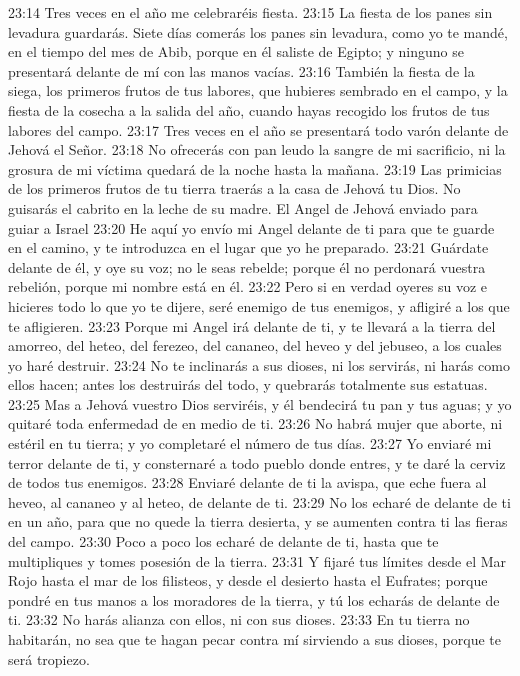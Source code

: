 23:14 Tres veces en el año me celebraréis fiesta. 
23:15 La fiesta de los panes sin levadura guardarás. Siete días comerás los panes sin levadura, como yo te mandé, en el tiempo del mes de Abib, porque en él saliste de Egipto; y ninguno se presentará delante de mí con las manos vacías. 
23:16 También la fiesta de la siega, los primeros frutos de tus labores, que hubieres sembrado en el campo, y la fiesta de la cosecha a la salida del año, cuando hayas recogido los frutos de tus labores del campo. 
23:17 Tres veces en el año se presentará todo varón delante de Jehová el Señor. 
23:18 No ofrecerás con pan leudo la sangre de mi sacrificio, ni la grosura de mi víctima quedará de la noche hasta la mañana. 
23:19 Las primicias de los primeros frutos de tu tierra traerás a la casa de Jehová tu Dios. No guisarás el cabrito en la leche de su madre. 
El Angel de Jehová enviado para guiar a Israel 
23:20 He aquí yo envío mi Angel delante de ti para que te guarde en el camino, y te introduzca en el lugar que yo he preparado. 
23:21 Guárdate delante de él, y oye su voz; no le seas rebelde; porque él no perdonará vuestra rebelión, porque mi nombre está en él. 
23:22 Pero si en verdad oyeres su voz e hicieres todo lo que yo te dijere, seré enemigo de tus enemigos, y afligiré a los que te afligieren. 
23:23 Porque mi Angel irá delante de ti, y te llevará a la tierra del amorreo, del heteo, del ferezeo, del cananeo, del heveo y del jebuseo, a los cuales yo haré destruir. 
23:24 No te inclinarás a sus dioses, ni los servirás, ni harás como ellos hacen; antes los destruirás del todo, y quebrarás totalmente sus estatuas. 
23:25 Mas a Jehová vuestro Dios serviréis, y él bendecirá tu pan y tus aguas; y yo quitaré toda enfermedad de en medio de ti. 
23:26 No habrá mujer que aborte, ni estéril en tu tierra; y yo completaré el número de tus días. 
23:27 Yo enviaré mi terror delante de ti, y consternaré a todo pueblo donde entres, y te daré la cerviz de todos tus enemigos. 
23:28 Enviaré delante de ti la avispa, que eche fuera al heveo, al cananeo y al heteo, de delante de ti. 
23:29 No los echaré de delante de ti en un año, para que no quede la tierra desierta, y se aumenten contra ti las fieras del campo. 
23:30 Poco a poco los echaré de delante de ti, hasta que te multipliques y tomes posesión de la tierra. 
23:31 Y fijaré tus límites desde el Mar Rojo hasta el mar de los filisteos, y desde el desierto hasta el Eufrates; porque pondré en tus manos a los moradores de la tierra, y tú los echarás de delante de ti. 
23:32 No harás alianza con ellos, ni con sus dioses. 
23:33 En tu tierra no habitarán, no sea que te hagan pecar contra mí sirviendo a sus dioses, porque te será tropiezo. 
